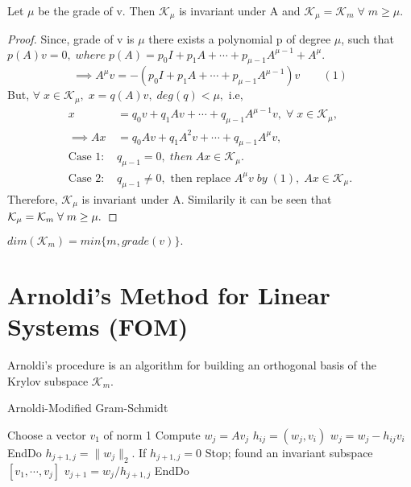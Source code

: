\documentclass[10pt,a4paper]{article}
\begin{document}
\begin{theorem}
Let $\mu$ be the grade of v. Then $\mathcal{K}_\mu$ is invariant under A and $\mathcal{K}_\mu = \mathcal{K}_m\;\forall\;m\ge\mu.$
\end{theorem}

\begin{proof}
Since, grade of v is $\mu$ there exists a polynomial p of degree $\mu$, such that $p(A)v=0,\;where\;p(A) = p_0I+p_1A+\cdots+p_{\mu-1}A^{\mu-1}+A^\mu.$
$$\implies A^\mu v = -(p_0I+p_1A+\cdots+p_{\mu-1}A^{\mu-1})v\qquad(1)$$
But, $\forall\;x\in\mathcal{K}_\mu,\;x=q(A)v,\;deg(q)<\mu,$ i.e,
\begin{align*}
x &= q_0v+q_1Av+\cdots+q_{\mu-1}A^{\mu-1}v,\;\forall\;x\in\mathcal{K}_\mu, \\
\implies Ax &= q_0Av+q_1A^2v+\cdots+q_{\mu-1}A^\mu v, \\
\text{Case 1: }& q_{\mu-1} = 0,\;then\;Ax\in\mathcal{K}_\mu. \\
\text{Case 2: }& q_{\mu-1} \neq 0,\text{ then replace }A^\mu v\;by\;(1),\;Ax\in\mathcal{K}_\mu.
\end{align*}
Therefore, $\mathcal{K}_\mu$ is invariant under A. Similarily it can be seen that $\mathcal{K}_\mu = \mathcal{K}_m \\
\;\forall\;m\ge\mu.$
\end{proof}

\begin{corollary}
$dim(\mathcal{K}_m) = min\{m,grade(v)\}.$
\end{corollary}

\section{Arnoldi's Method for Linear Systems (FOM)}

Arnoldi's procedure is an algorithm for building an orthogonal basis of the Krylov subspace $\mathcal{K}_m$.

\begin{algorithm}
\caption{Arnoldi-Modified Gram-Schmidt}
\begin{algorithmic}[1]
\State Choose a vector $v_1$ of norm 1
	\State Compute $w_j = Av_j$
		\State $h_{ij} = (w_j,v_i)$
		\State $w_j = w_j - h_{ij}v_i$
	\EndFor
	\State EndDo
	\State $h_{j+1,j} = \|w_j\|_2$. 
	\State If $h_{j+1,j}=0$ Stop; found an invariant subspace $[v_1,\cdots,v_j]$
	\State $v_{j+1}=w_j/h_{j+1,j}$
\EndFor
\State EndDo
\end{algorithmic}
\end{algorithm}
\end{document}

